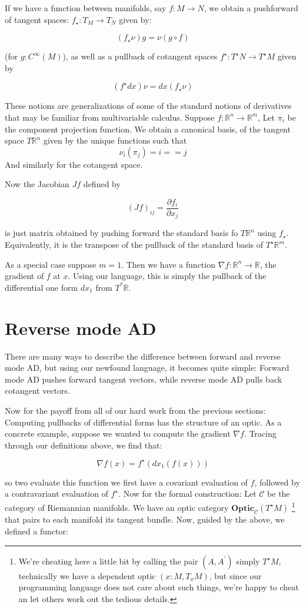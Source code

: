\documentclass[letterpaper, 10 pt, conference]{ieeeconf}  %
\newcommand{\Optic}{\textbf{Optic}}
\newcommand{\R}{\mathbb{R}}
\begin{document}
If we have a function between manifolds, say $f: M \to N$, we obtain a pushforward
of tangent spaces: $f_\star: T_M \to T_N$ given by:

\[
(f_\star \nu) g = \nu(g \circ f)
\]

(for $g: C^\infty(M)$), as well as a pullback of cotangent spaces $f^\star: T^\star N \to T^\star M$
given by

\[
(f^\star dx) \nu = dx(f_\star \nu)
\]

These notions are generalizations of some of the standard notions of derivatives
that may be familiar from multivariable calculus. Suppose $f: \R^n \to \R^m$,
Let $\pi_i$ be the component projection function. We obtain a canonical basis,
of the tangent space $T \R^n$ given by the unique functions such that
\[
\nu_i (\pi_j) = i == j
\]
And similarly for the cotangent space.

Now the Jacobian $J f$ defined by

\[
(J f)_{ij} = \frac{\partial f_i}{\partial x_j}
\]

is just matrix obtained by pushing forward the standard basis fo $T \R^n$ using
$f_\star$. Equivalently, it is the transpose of the pullback of the standard
basis of $T^\star \R^m$.

As a special case suppose $m=1$. Then we have a function $\nabla f: \R^n \to \R$,
the gradient of $f$ at $x$. Using our language, this is simply the pullback of
the differential one form $dx_1$ from $T^* \R$.

\section{Reverse mode AD}

There are many ways to describe the difference between forward and reverse mode
AD, but using our newfound language, it becomes quite simple: Forward mode AD
pushes forward tangent vectors, while reverse mode AD pulls back cotangent vectors.

Now for the payoff from all of our hard work from the previous sections: Computing
pullbacks of differential forms has the structure of an optic. As a concrete
example, suppose we wanted to compute the gradient $\nabla f$. Tracing through our
definitions above, we find that:

\[
\nabla f (x) = f^\star(dx_1(f(x)))
\]

so two evaluate this function we first have a covariant evaluation of $f$,
followed by a contravariant evaluation of $f^\star$. Now for the formal construction:
Let $\mathcal{C}$ be the category of Riemannian manifolds. We have an optic
category $\Optic_{\mathcal{C}}(T^\star M)$
\footnote{We're cheating here a little bit by calling the pair $(A,A^\prime)$ simply $T^\star M$,
technically we have a dependent optic $(x: M, T_x M)$, but since our programming
language does not care about such things, we're happy to cheat an let others work out the tedious details.}
that pairs to each manifold its
tangent bundle. Now, guided by the above, we defined a functor:
\end{document}
